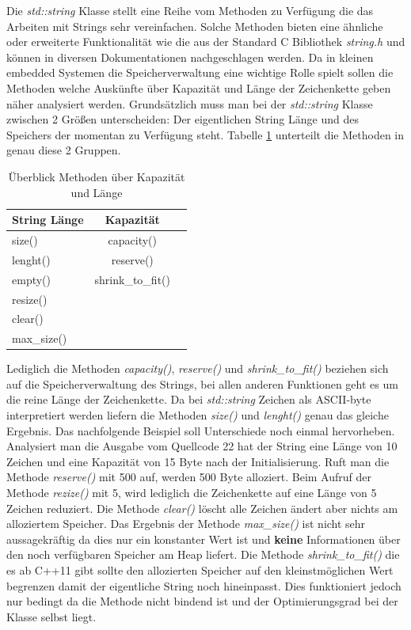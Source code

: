 \documentclass[MES,Master,ngerman]{twbook}%
\begin{document}
Die \textit{std::string} Klasse stellt eine Reihe vom Methoden zu Verfügung die das Arbeiten mit Strings sehr vereinfachen. Solche Methoden bieten eine ähnliche oder erweiterte Funktionalität wie die aus der Standard C Bibliothek \textit{string.h} und können in diversen Dokumentationen nachgeschlagen werden. Da in kleinen embedded Systemen die Speicherverwaltung eine wichtige Rolle spielt sollen die Methoden welche Auskünfte über Kapazität und Länge der Zeichenkette geben näher analysiert werden. Grundsätzlich muss man bei der \textit{std::string} Klasse zwischen 2 Größen unterscheiden: Der eigentlichen String Länge und des Speichers der momentan zu Verfügung steht. Tabelle \ref{tbl:string_method} unterteilt die Methoden in genau diese 2 Gruppen.

\begin{table}[!htb]
	\centering
	\begin{tabular}{| l | c | r |}
		\hline
		\textbf{String Länge}  & \textbf{Kapazität} \\ \hline
		size()        & capacity()				\\ \hline
		lenght()      & reserve() 	    		\\ \hline
		empty()       & shrink\_to\_fit() 		\\ \hline
		resize()      &   						\\ \hline
		clear()       &   					 	\\ \hline
		max\_size()   & 						\\ \hline
	
	\end{tabular}
	
	\caption{Überblick Methoden über Kapazität und Länge}
	\label{tbl:string_method}
\end{table}
Lediglich die Methoden \textit{capacity()}, \textit{reserve()} und \textit{shrink\_to\_fit()} beziehen sich auf die Speicherverwaltung des Strings, bei allen anderen Funktionen geht es um die reine Länge der Zeichenkette. Da bei \textit{std::string} Zeichen als ASCII-byte interpretiert werden liefern die Methoden \textit{size()} und \textit{lenght()} genau das gleiche Ergebnis. Das nachfolgende Beispiel soll Unterschiede noch einmal hervorheben. \newline\newline
Analysiert man die Ausgabe vom Quellcode 22 hat der String eine Länge von 10 Zeichen und eine Kapazität von 15 Byte nach der Initialisierung. Ruft man die Methode \textit{reserve()} mit 500 auf, werden 500 Byte alloziert. Beim Aufruf der Methode \textit{rezize()} mit 5, wird lediglich die Zeichenkette auf eine Länge von 5 Zeichen reduziert. Die Methode \textit{clear()} löscht alle Zeichen ändert aber nichts am alloziertem Speicher. Das Ergebnis der Methode \textit{max\_size()} ist nicht sehr aussagekräftig da dies nur ein konstanter Wert ist und \textbf{keine} Informationen über den noch verfügbaren Speicher am Heap liefert. Die Methode \textit{shrink\_to\_fit()} die es ab C++11 gibt sollte den allozierten Speicher auf den kleinstmöglichen Wert begrenzen damit der eigentliche String noch hineinpasst. Dies funktioniert jedoch nur bedingt da die Methode nicht bindend ist und der Optimierungsgrad bei der Klasse selbst liegt.
\end{document}
